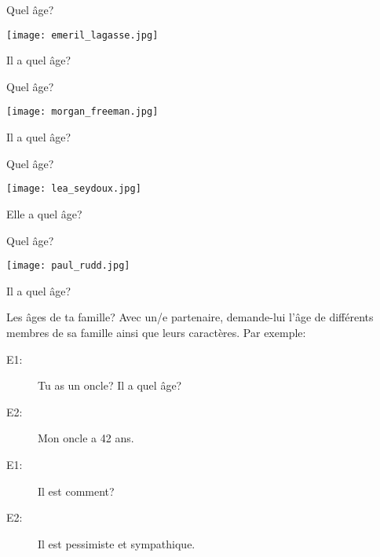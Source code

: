 \documentclass{beamer}
\begin{document}
  \begin{frame}{Quel âge?}
    \begin{center}
      \texttt{[image: emeril\_lagasse.jpg]}

      Il a quel âge? \underline{}
    \end{center}
  \end{frame}

  \begin{frame}{Quel âge?}
    \begin{center}
      \texttt{[image: morgan\_freeman.jpg]}

      Il a quel âge? \underline{} \\
    \end{center}
  \end{frame}

  \begin{frame}{Quel âge?}
    \begin{center}
      \texttt{[image: lea\_seydoux.jpg]}

      Elle a quel âge? \underline{}
    \end{center}
  \end{frame}

  \begin{frame}{Quel âge?}
    \begin{center}
      \texttt{[image: paul\_rudd.jpg]}

      Il a quel âge? \underline{} \\
    \end{center}
  \end{frame}

  \begin{frame}{Les âges de ta famille?}
    Avec un/e partenaire, demande-lui l'âge de différents membres de sa famille ainsi que leurs caractères.
    Par exemple: \\
    \begin{description}
      \item[E1:] Tu as un oncle? Il a quel âge?
      \item[] 
      \item[E2:] Mon oncle a 42 ans.
      \item[] 
      \item[E1:] Il est comment?
      \item[] 
      \item[E2:] Il est pessimiste et sympathique.
      \item[] 
    \end{description}
  \end{frame}
\end{document}
